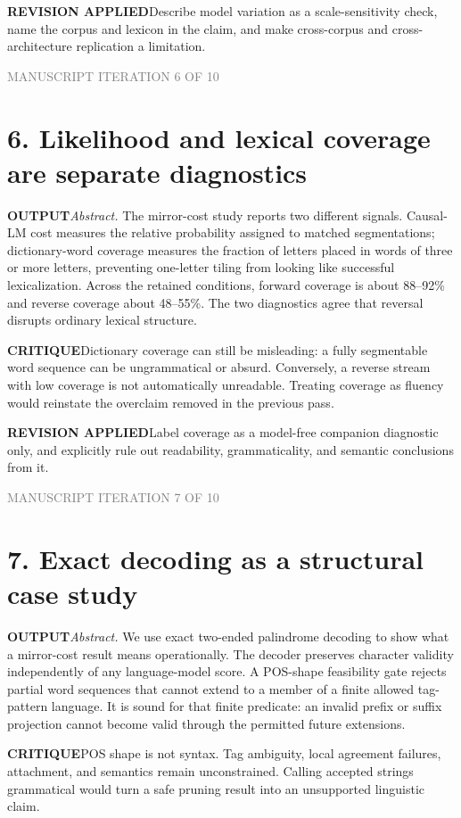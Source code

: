 \documentclass[10pt]{article}
\newcommand{\outputlabel}{\textcolor{teal!65!black}{\textbf{OUTPUT}}}
\newcommand{\critiquelabel}{\textcolor{red!65!black}{\textbf{CRITIQUE}}}
\newcommand{\reviselabel}{\textcolor{blue!65!black}{\textbf{REVISION APPLIED}}}
\newcommand{\pass}[1]{\textcolor{gray}{\small MANUSCRIPT ITERATION #1 OF 10}}
\begin{document}
\reviselabel\quad Describe model variation as a scale-sensitivity check, name the corpus and lexicon in the claim, and make cross-corpus and cross-architecture replication a limitation.

\newpage
\pass{6}
\section*{6. Likelihood and lexical coverage are separate diagnostics}
\outputlabel\quad \emph{Abstract.} The mirror-cost study reports two different signals. Causal-LM cost measures the relative probability assigned to matched segmentations; dictionary-word coverage measures the fraction of letters placed in words of three or more letters, preventing one-letter tiling from looking like successful lexicalization. Across the retained conditions, forward coverage is about 88--92\% and reverse coverage about 48--55\%. The two diagnostics agree that reversal disrupts ordinary lexical structure.

\critiquelabel\quad Dictionary coverage can still be misleading: a fully segmentable word sequence can be ungrammatical or absurd. Conversely, a reverse stream with low coverage is not automatically unreadable. Treating coverage as fluency would reinstate the overclaim removed in the previous pass.

\reviselabel\quad Label coverage as a model-free companion diagnostic only, and explicitly rule out readability, grammaticality, and semantic conclusions from it.

\newpage
\pass{7}
\section*{7. Exact decoding as a structural case study}
\outputlabel\quad \emph{Abstract.} We use exact two-ended palindrome decoding to show what a mirror-cost result means operationally. The decoder preserves character validity independently of any language-model score. A POS-shape feasibility gate rejects partial word sequences that cannot extend to a member of a finite allowed tag-pattern language. It is sound for that finite predicate: an invalid prefix or suffix projection cannot become valid through the permitted future extensions.

\critiquelabel\quad POS shape is not syntax. Tag ambiguity, local agreement failures, attachment, and semantics remain unconstrained. Calling accepted strings grammatical would turn a safe pruning result into an unsupported linguistic claim.
\end{document}

